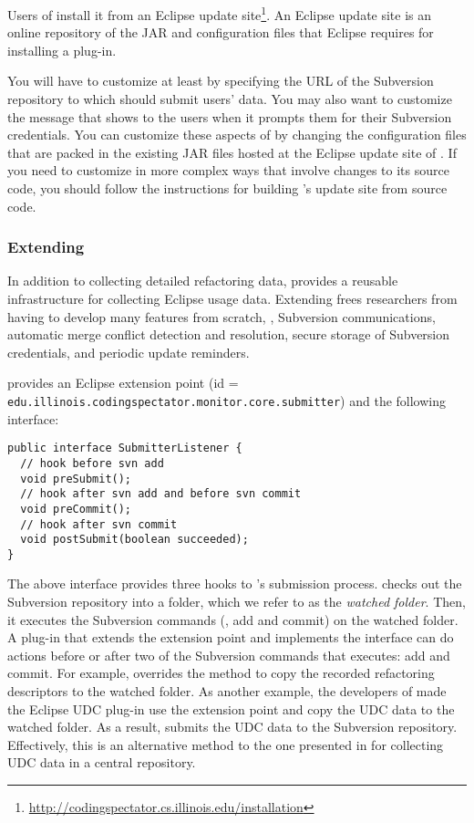 Users of \CodingSpectator{} install it from an Eclipse update
site\footnote{\url{http://codingspectator.cs.illinois.edu/installation}}. An
Eclipse update site is an online repository of the JAR and configuration files
that Eclipse requires for installing a plug-in.

You will have to customize \CodingSpectator{} at least by specifying the URL of
the Subversion repository to which \CodingSpectator{} should submit users' data.
You may also want to customize the message that \CodingSpectator{} shows to the
users when it prompts them for their Subversion credentials. You can customize
these aspects of \CodingSpectator{} by changing the configuration files that are
packed in the existing JAR files hosted at the Eclipse update site of
\CodingSpectator. If you need to customize \CodingSpectator{} in more complex
ways that involve changes to its source code, you should follow the instructions
for building \CodingSpectator's update site from source code.

\subsubsection{Extending \CodingSpectator}

In addition to collecting detailed refactoring data, \CodingSpectator provides a
reusable infrastructure for collecting Eclipse usage data. Extending
\CodingSpectator frees researchers from having to develop many features from
scratch, \eg, Subversion communications, automatic merge conflict detection and
resolution, secure storage of Subversion credentials, and periodic update
reminders.

\CodingSpectator provides an Eclipse extension point (id =
\texttt{edu.\-illinois.\-codingspectator.\-monitor.\-core.\-submitter}) and the
following interface:

\begin{lstlisting}
public interface SubmitterListener {
  // hook before svn add
  void preSubmit();
  // hook after svn add and before svn commit
  void preCommit();
  // hook after svn commit
  void postSubmit(boolean succeeded);
}
\end{lstlisting}

The above interface provides three hooks to \CodingSpectator's submission
process. \CodingSpectator{} checks out the Subversion repository into a folder,
which we refer to as the \emph{watched folder}. Then, it executes the Subversion
commands (\eg, add and commit) on the watched folder. A plug-in that extends the
 extension point and implements the 
interface can do actions before or after two of the Subversion commands that
\CodingSpectator{} executes: add and commit.
%
For example, \CodingSpectator{} overrides the method  to copy
the recorded refactoring descriptors to the watched folder. As another example,
the developers of \CodingSpectator{} made the Eclipse UDC plug-in use the
 extension point and copy the UDC data to the watched folder. As
a result, \CodingSpectator{} submits the UDC data to the Subversion repository.
Effectively, this is an alternative method to the one presented in
 for collecting UDC data in a central repository.

%
%

